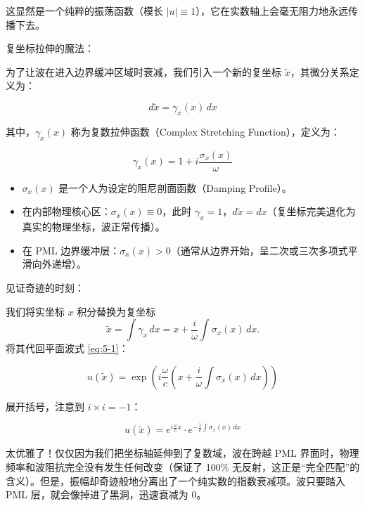 \documentclass[12pt]{article}
\begin{document}
{这显然是一个纯粹的振荡函数（模长 $|u| \equiv 1$），它在实数轴上会毫无阻力地永远传播下去。

复坐标拉伸的魔法：

为了让波在进入边界缓冲区域时衰减，我们引入一个新的复坐标 $\tilde{x}$，其微分关系定义为：

\begin{equation}
d\tilde{x} = \gamma_x(x)\, dx
\label{eq:5-2}
\end{equation}

其中，$\gamma_x(x)$ 称为复数拉伸函数（Complex Stretching Function），定义为：

\begin{equation}
\gamma_x(x) = 1 + i \frac{\sigma_x(x)}{\omega}
\label{eq:5-3}
\end{equation}

\begin{itemize}[leftmargin=2em]
    \item $\sigma_x(x)$ 是一个人为设定的阻尼剖面函数（Damping Profile）。
    \item 在内部物理核心区：$\sigma_x(x) \equiv 0$，此时 $\gamma_x = 1$，$d\tilde{x} = dx$（复坐标完美退化为真实的物理坐标，波正常传播）。
    \item 在 PML 边界缓冲层：$\sigma_x(x) > 0$（通常从边界开始，呈二次或三次多项式平滑向外递增）。
\end{itemize}

见证奇迹的时刻：

我们将实坐标 $x$ 积分替换为复坐标
\[
\tilde{x} = \int \gamma_x\, dx = x + \frac{i}{\omega} \int \sigma_x(x)\, dx.
\]
将其代回平面波式 \eqref{eq:5-1}：

\begin{equation}
u(\tilde{x}) = \exp\left( i \frac{\omega}{c} \left( x + \frac{i}{\omega} \int \sigma_x(x)\, dx \right) \right)
\label{eq:5-3-sub}
\end{equation}

展开括号，注意到 $i \times i = -1$：

\begin{equation}
u(\tilde{x})
=
e^{i \frac{\omega}{c} x}
\cdot
e^{-\frac{1}{c} \int \sigma_x(x)\, dx}
\label{eq:5-4}
\end{equation}

太优雅了！仅仅因为我们把坐标轴延伸到了复数域，波在跨越 PML 界面时，物理频率和波阻抗完全没有发生任何改变（保证了 100\% 无反射，这正是“完全匹配”的含义）。但是，振幅却奇迹般地分离出了一个纯实数的指数衰减项。波只要踏入 PML 层，就会像掉进了黑洞，迅速衰减为 0。

}
\end{document}
